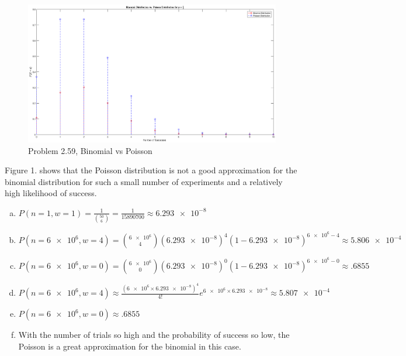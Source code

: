 \documentclass[12pt]{article}
\newenvironment{problem}[2][Problem]{\begin{trivlist}
\item[\hskip \labelsep {\bfseries #1}\hskip \labelsep {\bfseries #2.}]
  \vspace{1 cm}
}{\end{trivlist}}
\begin{document}
\begin{problem}{2.59} 
  \item %
    \begin{figure}[htpb]
      \centering
        \includegraphics[width=\textwidth,height=\textheight,keepaspectratio]{problem_2_59.eps}
        \caption{Problem 2.59, Binomial vs Poisson}
    \end{figure}
\item %
  Figure 1. shows that the Poisson distribution is not a good approximation
  for the binomial distribution for such a small number of experiments and a
  relatively high likelihood of success.
\end{problem} 

\newpage
\begin{problem}{2.61}
\item
  \begin{enumerate}[a.]
    \item %
      $P(n=1,w=1) = \frac{1}{\binom{50}{6}} = \frac{1}{15890700} \approx \num{6.293e-8}$
    \item %
      $P(n=\num{6e6},w=4) = \binom{\num{6e6}}{4} (\num{6.293e-8})^4 (1-\num{6.293e-8})^{\num{6e6}-4} \approx \num{5.806e-4}$
    \item %
      $P(n=\num{6e6},w=0) = \binom{\num{6e6}}{0} (\num{6.293e-8})^0 (1-\num{6.293e-8})^{\num{6e6}-0} \approx .6855$
    \item %
      $P(n=\num{6e6},w=4) 
      \approx \frac{(\num{6e6}\times\num{6.293e-8})^4}{4!}e^{\num{6e6}\times\num{6.293e-8}} 
      \approx \num{5.807e-4}$ 
    \item %
      $P(n=\num{6e6},w=0) \approx .6855$
    \item %
      With the number of trials so high and the probability of success so low,
      the Poisson is a great approximation for the binomial in this case. 
  \end{enumerate}
\end{problem}
\end{document}

